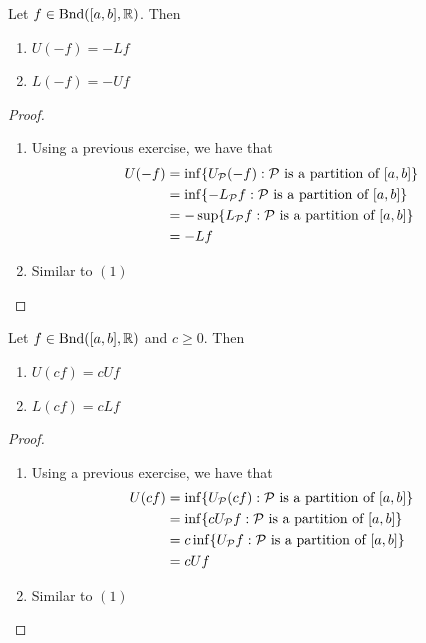 \documentclass{book}
\begin{document}
	\begin{ex}  
		Let $f \in \text{Bnd}([a,b], \mathbb{R})$. Then 
		\begin{enumerate}
			\item $U(-f) = -Lf$
			\item $L(-f) = -Uf$
		\end{enumerate}
	\end{ex}
	
	\begin{proof} \
		\begin{enumerate}
			\item Using a previous exercise, we have that
			\begin{align*}
				U(-f)
				&= \inf \{U_{\mathcal{P}}(-f): \mathcal{P} \text{ is a partition of } [a,b]\} \\
				&= \inf \{ -L_{\mathcal{P}} f: \mathcal{P} \text{ is a partition of } [a,b]\} \\
				&= - \sup \{L_{\mathcal{P}} f: \mathcal{P} \text{ is a partition of } [a,b]\} \\
				&= - Lf
			\end{align*}
			\item Similar to $(1)$
		\end{enumerate}
	\end{proof}
	
	\begin{ex}  
		Let $f \in \text{Bnd}([a,b], \mathbb{R})$ and $c \geq 0$. Then 
		\begin{enumerate}
			\item $U (cf) = c U f$ 
			\item $L (cf) = c L f $
		\end{enumerate}
	\end{ex}
	
	\begin{proof}\
		\begin{enumerate}
			\item Using a previous exercise, we have that
			\begin{align*}
				U(cf) 
				&= \inf \{U_{\mathcal{P}} (cf): \mathcal{P} \text{ is a partition of } [a,b]\} \\
				&= \inf \{c U_{\mathcal{P}} f: \mathcal{P} \text{ is a partition of } [a,b]\} \\
				&= c \inf \{U_{\mathcal{P}} f: \mathcal{P} \text{ is a partition of } [a,b]\} \\
				&= c Uf
			\end{align*}
			\item Similar to $(1)$
		\end{enumerate}
	\end{proof}
	
\end{document}
